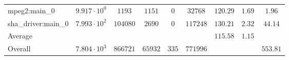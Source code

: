 \begin{tabular}{|l|c|c|c|c|c|c|c|c|}
mpeg2:main\_0           & $ 9.917 \cdot 10^{0} $ & $ 1193   $ & $ 1151  $ & $ 0   $ & $ 32768  $ & $ 120.29      $ & $ 1.69    $ & $ 1.96    $ \\
sha\_driver:main\_0     & $ 7.993 \cdot 10^{2} $ & $ 104080 $ & $ 2690  $ & $ 0   $ & $ 117248 $ & $ 130.21      $ & $ 2.32    $ & $ 44.14   $ \\
\hline
Average                 & $                    $ & $        $ & $       $ & $     $ & $        $ & $ 115.58      $ & $ 1.15    $ & $         $ \\
\hline
Overall                 & $ 7.804 \cdot 10^{3} $ & $ 866721 $ & $ 65932 $ & $ 335 $ & $ 771996 $ & $             $ & $         $ & $ 553.81  $ \\
\hline
\end{tabular}
